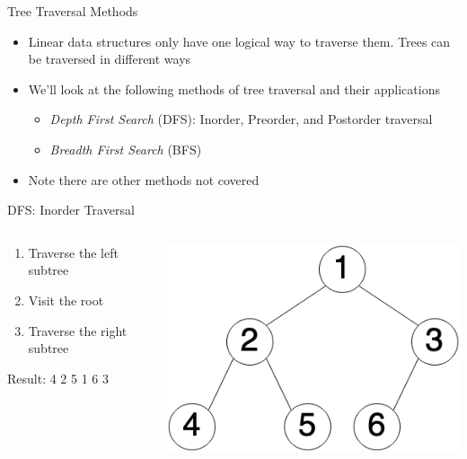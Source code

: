 \documentclass[
  ignorenonframetext,
]{beamer}
\begin{document}
\begin{frame}{Tree Traversal Methods}
\protect\hypertarget{tree-traversal-methods}{}
\begin{itemize}
\item
  Linear data structures only have one logical way to traverse them.
  Trees can be traversed in different ways
\item
  We'll look at the following methods of tree traversal and their
  applications

  \begin{itemize}
  \item
    \emph{Depth First Search} (DFS): Inorder, Preorder, and Postorder
    traversal
  \item
    \emph{Breadth First Search} (BFS)
  \end{itemize}
\item
  Note there are other methods not covered
\end{itemize}
\end{frame}

\begin{frame}{DFS: Inorder Traversal}
\protect\hypertarget{dfs-inorder-traversal}{}
\begin{columns}[T]
\begin{column}{0.6\textwidth}
\begin{enumerate}
\item
  Traverse the left subtree
\item
  Visit the root
\item
  Traverse the right subtree
\end{enumerate}

\vspace{1cm}

Result: 4 2 5 1 6 3
\end{column}

\begin{column}{0.4\textwidth}
\includegraphics{images/tree-num.png}
\end{column}
\end{columns}
\end{frame}
\end{document}

